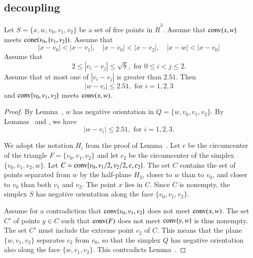 \newpage


\subsection{decoupling}



\begin{lemma}
Let $S=\{x,w,v_0,v_1,v_2\}$ be a set of five points
in $\ring{R}^3$.  Assume that
  ${\operatorname{conv}}\{x,w\}$ meets ${\operatorname{cone}}(v_0,\{v_1,v_2\})$.  
Assume that
  $$
  |x-v_0| < |x-v_1|,\quad 
  |x-v_0| < |x-v_2|,\quad
  |x-w| < |x-v_0|
  $$
Assume that 
  $$
  2\le |v_i-v_j|\le \sqrt{8}, \text{ for } 0\le i < j \le 2.
  $$
Assume that at most one of $|v_i-v_j|$ is greater than $2.51$.
Then
  $$|w-v_i|\le 2.51,\text{ for } i=1,2,3$$
and ${\operatorname{conv}}\{v_0,v_1,v_2\}$ meets ${\operatorname{conv}}(x,w)$.
\end{lemma}


\begin{proof}
By Lemma~, $w$ has negative orientation
in $Q=\{w,v_0,v_1,v_2\}$.
By
Lemmas~ and ,
we have
  $$|w-v_i|\le 2.51,\text{ for } i=1,2,3.$$

We adopt the notation $H_i$ from the proof of
Lemma~.
Let $c$ be the circumcenter of the triangle $F=\{v_0,v_1,v_2\}$ and
let $c_2$ be the circumcenter of the simplex $\{v_0,v_1,v_2,w\}$.
Let $C={\operatorname{conv}}\{v_0,v_1/2,v_2/2,c,c_2\}$.  The set
$C$ contains the set of points separated from $w$ by the
half-plane $H_3$, closer to $w$ than to $v_0$, and closer to $v_0$
than both $v_1$ and $v_2$. The point $x$ lies in
$C$. Since $C$ is nonempty, the simplex $S$ has
negative orientation along the face $\{v_0,v_1,v_2\}$.

Assume for a contradiction that ${\operatorname{conv}}\{v_0,v_1,v_2\}$
does not meet ${\operatorname{conv}}(x,w)$.
The set $C'$ of points $y\in C$ such that 
  ${\operatorname{conv}}(F)$ does not meet ${\operatorname{conv}}\{y,w\}$ is thus
nonempty. The set $C'$ must include the extreme point $c_2$ of
$C$. This means that the plane $\{w,v_1,v_2\}$ separates $c_2$
from $v_0$, so that the simplex $Q$ has negative orientation
also along the face $\{w,v_1,v_2\}$.  This contradicts
Lemma~.
\end{proof}


